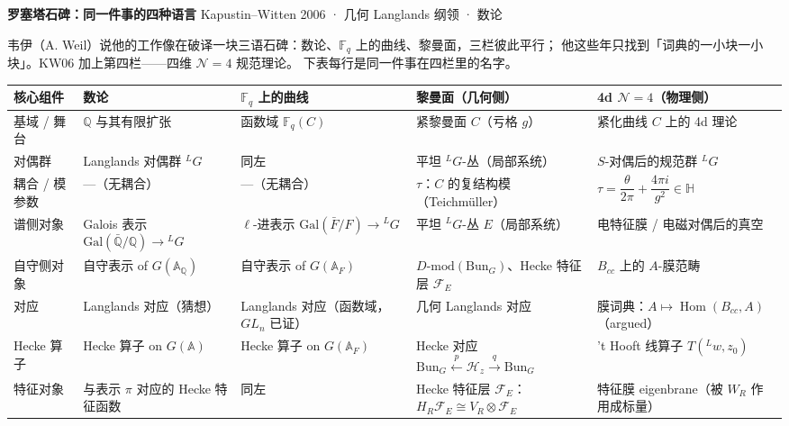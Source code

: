 \documentclass[9pt]{article}
\begin{document}
{\Large\bfseries 罗塞塔石碑：同一件事的四种语言}\hfill
{\small\color{gcol}Kapustin--Witten 2006 · 几何 Langlands 纲领 · 数论}

\vspace{2pt}
{\small\color{gcol}
韦伊（A. Weil）说他的工作像在破译一块三语石碑：数论、$\mathbb F_q$ 上的曲线、黎曼面，三栏彼此平行；
他这些年只找到「词典的一小块一小块」。KW06 加上第四栏——四维 $\mathcal N=4$ 规范理论。
下表每行是同一件事在四栏里的名字。}

\vspace{6pt}
\begingroup\footnotesize
\setlength{\tabcolsep}{4pt}
\renewcommand{\arraystretch}{1.28}
\begin{longtable}{@{}p{2.5cm}p{4.5cm}p{5.3cm}p{5.3cm}p{4.6cm}@{}}
\toprule
\textbf{核心组件} & \textbf{数论} & \textbf{$\mathbb F_q$ 上的曲线} & \textbf{黎曼面（几何侧）} & \textbf{4d $\mathcal N=4$（物理侧）} \\
\midrule
\endhead
基域 / 舞台
& $\mathbb Q$ 与其有限扩张
& 函数域 $\mathbb F_q(C)$
& 紧黎曼面 $C$（亏格 $g$）
& 紧化曲线 $C$ 上的 4d 理论 \\
\midrule
对偶群
& Langlands 对偶群 ${}^{L}G$
& 同左
& 平坦 ${}^{L}G$-丛（局部系统）
& $S$-对偶后的规范群 ${}^{L}G$ \\
\midrule
耦合 / 模参数
& —（无耦合）
& —（无耦合）
& $\tau$：$C$ 的复结构模（Teichmüller）
& $\tau=\dfrac{\theta}{2\pi}+\dfrac{4\pi i}{g^{2}}\in\mathbb H$ \\
\midrule
谱侧对象
& Galois 表示 $\mathrm{Gal}(\bar{\mathbb Q}/\mathbb Q)\to{}^{L}G$
& $\ell$-进表示 $\mathrm{Gal}(\bar F/F)\to{}^{L}G$
& 平坦 ${}^{L}G$-丛 $E$（局部系统）
& 电特征膜 / 电磁对偶后的真空 \\
\midrule
自守侧对象
& 自守表示 of $G(\mathbb A_{\mathbb Q})$
& 自守表示 of $G(\mathbb A_F)$
& $D\text{-mod}(\mathrm{Bun}_G)$、Hecke 特征层 $\mathcal F_E$
& $B_{cc}$ 上的 $A$-膜范畴 \\
\midrule
对应
& Langlands 对应（猜想）
& Langlands 对应（函数域，$GL_n$ 已证）
& 几何 Langlands 对应
& 膜词典：$A\mapsto\operatorname{Hom}(B_{cc},A)$（argued） \\
\midrule
Hecke 算子
& Hecke 算子 on $G(\mathbb A)$
& Hecke 算子 on $G(\mathbb A_F)$
& Hecke 对应 $\mathrm{Bun}_G\xleftarrow{p}\mathcal H_z\xrightarrow{q}\mathrm{Bun}_G$
& 't Hooft 线算子 $T({}^{L}w,z_0)$ \\
\midrule
特征对象
& 与表示 $\pi$ 对应的 Hecke 特征函数
& 同左
& Hecke 特征层 $\mathcal F_E$：$H_R\mathcal F_E\cong V_R\otimes\mathcal F_E$
& 特征膜 eigenbrane（被 $W_R$ 作用成标量） \\

\end{longtable}
\end{document}
